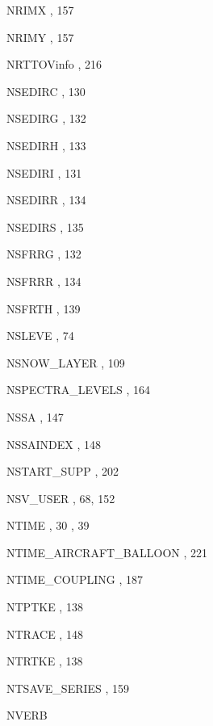 \begin{theindex}
  \item NRIMX
    \subitem {},  157
  \item NRIMY
    \subitem {},  157
  \item NRTTOVinfo
    \subitem {},  216
  \item NSEDIRC
    \subitem {},  130
  \item NSEDIRG
    \subitem {},  132
  \item NSEDIRH
    \subitem {},  133
  \item NSEDIRI
    \subitem {},  131
  \item NSEDIRR
    \subitem {},  134
  \item NSEDIRS
    \subitem {},  135
  \item NSFRRG
    \subitem {},  132
  \item NSFRRR
    \subitem {},  134
  \item NSFRTH
    \subitem {},  139
  \item NSLEVE
    \subitem {},  74
  \item NSNOW\_LAYER
    \subitem {},  109
  \item NSPECTRA\_LEVELS
    \subitem {},  164
  \item NSSA
    \subitem {},  147
  \item NSSAINDEX
    \subitem {},  148
  \item NSTART\_SUPP
    \subitem {},  202
  \item NSV\_USER
    \subitem {},  68, 152
  \item NTIME
    \subitem {},  30
    \subitem {},  39
  \item NTIME\_AIRCRAFT\_BALLOON
    \subitem {},  221
  \item NTIME\_COUPLING
    \subitem {},  187
  \item NTPTKE
    \subitem {},  138
  \item NTRACE
    \subitem {},  148
  \item NTRTKE
    \subitem {},  138
  \item NTSAVE\_SERIES
    \subitem {},  159
  \item NVERB

\end{theindex}
